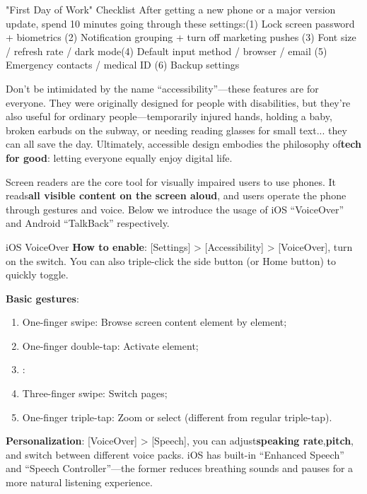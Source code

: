 \begin{tcbinfo}{"First Day of Work" Checklist}
After getting a new phone or a major version update, spend 10 minutes going through these settings:\newline (1) Lock screen password + biometrics (2) Notification grouping + turn off marketing pushes (3) Font size / refresh rate / dark mode\newline (4) Default input method / browser / email (5) Emergency contacts / medical ID (6) Backup settings

\end{tcbinfo}


Don't be intimidated by the name “accessibility”—these features are for everyone. They were originally designed for people with disabilities, but they're also useful for ordinary people—temporarily injured hands, holding a baby, broken earbuds on the subway, or needing reading glasses for small text... they can all save the day. Ultimately, accessible design embodies the philosophy of\textbf{tech for good}: letting everyone equally enjoy digital life.


Screen readers are the core tool for visually impaired users to use phones. It reads\textbf{all visible content on the screen aloud}, and users operate the phone through gestures and voice. Below we introduce the usage of iOS “VoiceOver” and Android “TalkBack” respectively.

\begin{tcbinfo}{iOS VoiceOver}
\textbf{How to enable}: [Settings] > [Accessibility] > [VoiceOver], turn on the switch. You can also triple-click the side button (or Home button) to quickly toggle.

\textbf{Basic gestures}:

\begin{enumerate}
  \item One-finger swipe: Browse screen content element by element;
  \item One-finger double-tap: Activate element;
  \item :
  \item Three-finger swipe: Switch pages;
  \item One-finger triple-tap: Zoom or select (different from regular triple-tap).
\end{enumerate}

\textbf{Personalization}: [VoiceOver] > [Speech], you can adjust\textbf{speaking rate},\textbf{pitch}, and switch between different voice packs. iOS has built-in “Enhanced Speech” and “Speech Controller”—the former reduces breathing sounds and pauses for a more natural listening experience.

\end{tcbinfo}

